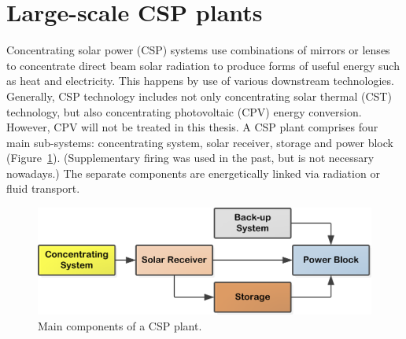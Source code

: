 \section{Large-scale CSP plants}\label{Large scale concentrated solar power (CSP) plants}
Concentrating solar power (CSP) systems use combinations of mirrors or lenses to concentrate direct beam solar radiation to produce forms of useful energy such as heat and electricity. This happens by use of various downstream technologies. Generally, CSP technology includes not only concentrating solar thermal (CST) technology, but also concentrating photovoltaic (CPV) energy conversion. However, CPV will not be treated in this thesis.
A CSP plant comprises four main sub-systems: concentrating system, solar receiver, storage and power block (Figure~\ref{MainComp}). (Supplementary firing was used in the past, but is not necessary nowadays.) The separate components are energetically linked via radiation or fluid transport.
\begin{figure}[!h] 
\centering
\includegraphics[width=0.85\linewidth]{FIG/MainComp}
\caption[Main components of a CSP plant.]{Main components of a CSP plant.}\label{MainComp}
\end{figure}

